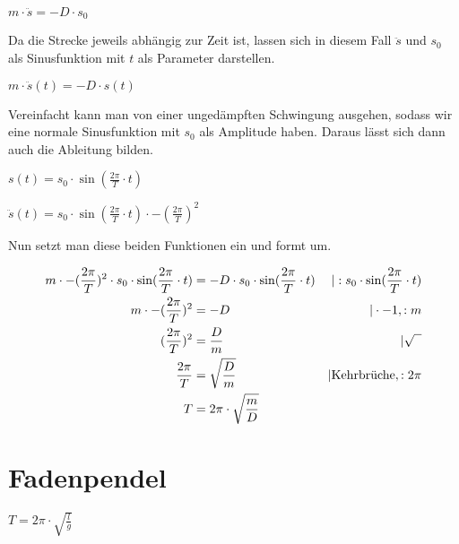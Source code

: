 \documentclass{article}
\begin{document}
\large
$m \cdot \ddot{s} = -D \cdot s_0$
\vspace{0.5cm}

\normalsize
Da die Strecke jeweils abhängig zur Zeit ist, lassen sich in diesem Fall $\ddot{s}$ und
$s_0$ als Sinusfunktion mit $t$ als Parameter darstellen.

\large
$m \cdot \ddot{s}(t) = -D \cdot s(t)$
\vspace{0.5cm}

\normalsize
Vereinfacht kann man von einer ungedämpften Schwingung ausgehen, sodass wir eine
normale Sinusfunktion mit $s_0$ als Amplitude haben. Daraus lässt sich dann auch die
Ableitung bilden.

\large
$s(t) = s_0 \cdot \sin (\frac{2\pi}{T} \cdot t)$

$\ddot{s}(t) = s_0 \cdot \sin (\frac{2\pi}{T} \cdot t) \cdot -(\frac{2\pi}{T})^2$
\vspace{0.5cm}

\normalsize
Nun setzt man diese beiden Funktionen ein und formt um.

\large
\begin{align*}
    m \cdot -(\frac{2\pi}{T})^2 \cdot s_0 \cdot \sin (\frac{2\pi}{T} \cdot t) & =
    -D \cdot s_0 \cdot \sin (\frac{2\pi}{T} \cdot t)
                                                                              & | : s_0 \cdot \sin (\frac{2\pi}{T} \cdot t) \\
    m \cdot -(\frac{2\pi}{T})^2                                               & =
    -D                                                                        & | \cdot -1, : m                             \\
    (\frac{2\pi}{T})^2                                                        & =
    \frac{D}{m}                                                               & | \sqrt{\phantom{x}}                        \\
    \frac{2\pi}{T}                                                            & =
    \sqrt{\frac{D}{m}}                                                        & | \text{\normalsize Kehrbrüche}, : 2\pi     \\
    T                                                                         & =
    2\pi \cdot \sqrt{\frac{m}{D}}
\end{align*}

\clearpage

\section*{Fadenpendel}

$T = 2\pi \cdot \sqrt{\frac{l}{g}}$
\end{document}
